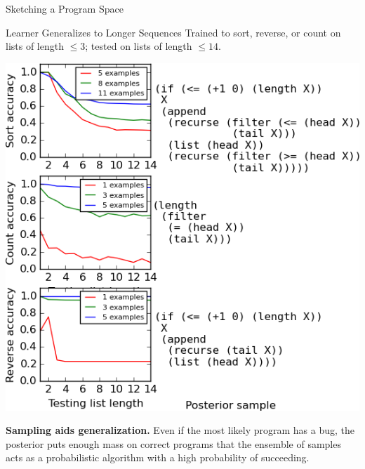 \documentclass[final]{beamer}
\newlength{\onecolwid}
\begin{document}
\begin{frame}[t]
\begin{columns}[t]
\begin{column}{\onecolwid}
  \begin{block}{Sketching a Program Space}
    \centering{}
  \end{block}


\begin{block}{Learner Generalizes to Longer Sequences}
  Trained to sort, reverse, or count on lists of length $\leq 3$; tested on lists of length $\leq 14$.
  
\hspace{5cm}    \includegraphics[width=33cm]{tinyList.png}

    \textbf{Sampling aids generalization.} Even if the most likely program has a bug, the posterior puts enough mass on correct programs that the ensemble of samples acts as a probabilistic algorithm with a high probability of succeeding.
    
\end{block}



\end{column}
\end{columns}
\end{frame}
\end{document}
